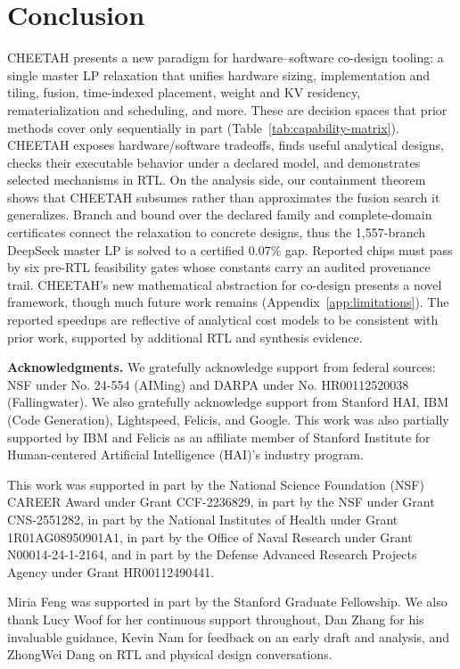 \section{Conclusion}
\label{sec:conclusion}
CHEETAH presents a new paradigm for hardware--software co-design tooling: a single master LP relaxation that unifies hardware sizing, implementation and tiling, fusion, time-indexed placement, weight and KV residency, rematerialization and scheduling, and more.
These are decision spaces that prior methods cover only sequentially in part (Table~\ref{tab:capability-matrix}).
CHEETAH exposes hardware/software tradeoffs, finds useful analytical designs, checks their executable behavior under a declared model, and demonstrates selected mechanisms in RTL.
On the analysis side, our containment theorem shows that CHEETAH subsumes rather than approximates the fusion search it generalizes.
Branch and bound over the declared family and complete-domain certificates connect the relaxation to concrete designs, thus the 1,557-branch DeepSeek master LP is solved to a certified $0.07\%$ gap.
Reported chips must pass by six pre-RTL feasibility gates whose constants carry an audited provenance trail.
CHEETAH's new mathematical abstraction for co-design presents a novel framework, though much future work remains (Appendix~\ref{app:limitations}).
The reported speedups are reflective of analytical cost models to be consistent with prior work, supported by additional RTL and synthesis evidence.



\newpage
\textbf{Acknowledgments.} We gratefully acknowledge support from federal sources: NSF under No. 24-554 (AIMing) and DARPA under No. HR00112520038 (Fallingwater).
We also gratefully acknowledge support from Stanford HAI, IBM (Code Generation), Lightspeed, Felicis, and Google.
This work was also partially supported by IBM and Felicis as an affiliate member of Stanford Institute for Human-centered Artificial Intelligence (HAI)’s industry program.

This work was supported in part by the National Science Foundation (NSF) CAREER Award under Grant CCF-2236829, in part by the NSF under Grant CNS-2551282, in part by the National Institutes of Health under Grant 1R01AG08950901A1, in part by the Office of Naval Research under Grant N00014-24-1-2164, and in part by the Defense Advanced Research Projects Agency under Grant HR00112490441.

Miria Feng was supported in part by the Stanford Graduate Fellowship.
We also thank Lucy Woof for her continuous support throughout, Dan Zhang for his invaluable guidance, Kevin Nam for feedback on an early draft and analysis, and ZhongWei Dang on RTL and physical design conversations.
